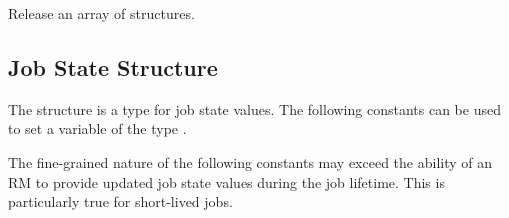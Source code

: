 
\begin{arglist}
\end{arglist}


Release an array of  structures.


\begin{arglist}
\end{arglist}


\subsection{Job State Structure}
\label{api:struct:jobstate}

The  structure is a  type for job state values. The following constants can be used to set a variable of the type .

\adviceuserstart
The fine-grained nature of the following constants may exceed the ability of an \ac{RM} to provide updated job state values during the job lifetime. This is particularly true for short-lived jobs.
\adviceuserend

